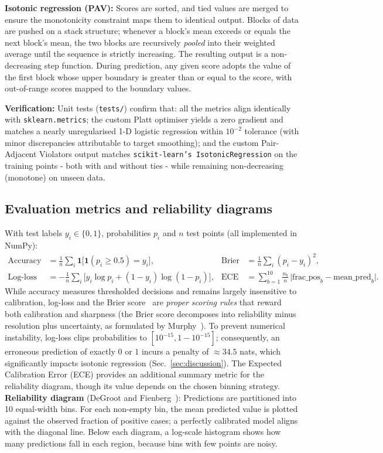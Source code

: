\documentclass[11pt,a4paper]{article}
\begin{document}
\textbf{Isotonic regression (PAV):} Scores are sorted, and tied values are merged to ensure the monotonicity constraint maps them to identical output. Blocks of data are pushed on a stack structure; whenever a block's mean exceeds or equals the next block's mean, the two blocks are recursively \emph{pooled} into their weighted average until the sequence is strictly increasing. The resulting output is a non-decreasing step function. During prediction, any given score adopts the value of the first block whose upper boundary is greater than or equal to the score, with out-of-range scores mapped to the boundary values.

\textbf{Verification:} Unit tests (\texttt{tests/}) confirm that: all the metrics align identically with \texttt{sklearn.metrics}; the custom Platt optimiser yields a zero gradient and matches a nearly unregularised 1-D logistic regression within $10^{-2}$ tolerance (with minor discrepancies attributable to target smoothing); and the custom Pair-Adjacent Violators output matches \texttt{scikit-learn's IsotonicRegression} on the training points - both with and without ties - while remaining non-decreasing (monotone) on unseen data.

\subsection{Evaluation metrics and reliability diagrams}
With test labels $y_i\in\{0,1\}$, probabilities $p_i$ and $n$ test points (all implemented in NumPy):
\begin{align*}
\text{Accuracy}&=\tfrac1n\sum_i \mathbf 1\big[\mathbf 1(p_i\ge0.5)=y_i\big], &
\text{Brier}&=\tfrac1n\sum_i (p_i-y_i)^2,\\
\text{Log-loss}&=-\tfrac1n\sum_i\big[y_i\log p_i+(1-y_i)\log(1-p_i)\big],&
\text{ECE}&=\sum_{b=1}^{10}\tfrac{n_b}{n}\,\big|\mathrm{frac\_pos}_b-\mathrm{mean\_pred}_b\big|.
\end{align*}
While accuracy measures thresholded decisions and remains largely insensitive to calibration, log-loss and the Brier score~\cite{brier50} are \emph{proper scoring rules} that reward both calibration and sharpness (the Brier score decomposes into reliability minus resolution plus uncertainty, as formulated by Murphy~\cite{murphy73}). To prevent numerical instability, log-loss clips probabilities to $[10^{-15},1-10^{-15}]$; consequently, an erroneous prediction of exactly $0$ or $1$ incurs a penalty of $\approx34.5$ nats, which significantly impacts isotonic regression (Sec.~\ref{sec:discussion}). The Expected Calibration Error (ECE) provides an additional summary metric for the reliability diagram, though its value depends on the chosen binning strategy.
\textbf{Reliability diagram} (DeGroot and Fienberg~\cite{dgf82}): Predictions are partitioned into 10 equal-width bins. For each non-empty bin, the mean predicted value is plotted against the observed fraction of positive cases; a perfectly calibrated model aligns with the diagonal line. Below each diagram, a log-scale histogram shows how many predictions fall in each region, because bins with few points are noisy.
\end{document}
